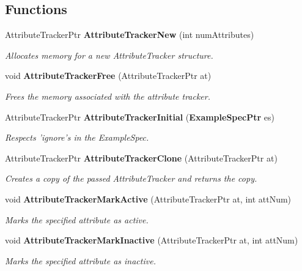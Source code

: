\subsection*{Functions}
\begin{CompactItemize}
\item 
Attribute\-Tracker\-Ptr {\bf Attribute\-Tracker\-New} (int num\-Attributes)
\begin{CompactList}\small\item\em Allocates memory for a new Attribute\-Tracker structure. \item\end{CompactList}\item 
void {\bf Attribute\-Tracker\-Free} (Attribute\-Tracker\-Ptr at)
\begin{CompactList}\small\item\em Frees the memory associated with the attribute tracker. \item\end{CompactList}\item 
Attribute\-Tracker\-Ptr {\bf Attribute\-Tracker\-Initial} ({\bf Example\-Spec\-Ptr} es)
\begin{CompactList}\small\item\em Respects 'ignore's in the Example\-Spec. \item\end{CompactList}\item 
Attribute\-Tracker\-Ptr {\bf Attribute\-Tracker\-Clone} (Attribute\-Tracker\-Ptr at)
\begin{CompactList}\small\item\em Creates a copy of the passed Attribute\-Tracker and returns the copy. \item\end{CompactList}\item 
void {\bf Attribute\-Tracker\-Mark\-Active} (Attribute\-Tracker\-Ptr at, int att\-Num)
\begin{CompactList}\small\item\em Marks the specified attribute as active. \item\end{CompactList}\item 
void {\bf Attribute\-Tracker\-Mark\-Inactive} (Attribute\-Tracker\-Ptr at, int att\-Num)
\begin{CompactList}\small\item\em Marks the specified attribute as inactive. \item\end{CompactList}\item 

\end{CompactItemize}
